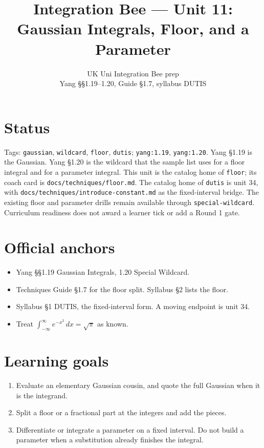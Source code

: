 
\title{Integration Bee --- Unit 11:\\ Gaussian Integrals, Floor, and a Parameter}
\author{UK Uni Integration Bee prep\\ Yang \S\S1.19--1.20, Guide \S1.7, syllabus DUTIS}
\date{}

\maketitle
\section*{Status}
Tags: \texttt{gaussian}, \texttt{wildcard}, \texttt{floor}, \texttt{dutis}; \texttt{yang:1.19}, \texttt{yang:1.20}.
Yang \S1.19 is the Gaussian. Yang \S1.20 is the wildcard that the sample list uses for a floor integral and for a parameter integral. This unit is the catalog home of \texttt{floor}; its coach card is \texttt{docs/techniques/floor.md}. The catalog home of \texttt{dutis} is unit 34, with \texttt{docs/techniques/introduce-constant.md} as the fixed-interval bridge. The existing floor and parameter drills remain available through \texttt{special-wildcard}. Curriculum readiness does not award a learner tick or add a Round 1 gate.
\section{Official anchors}
\begin{itemize}
  \item Yang §§1.19 Gaussian Integrals, 1.20 Special Wildcard.
  \item Techniques Guide §1.7 for the floor split. Syllabus §2 lists the floor.
  \item Syllabus §1 DUTIS, the fixed-interval form. A moving endpoint is unit 34.
  \item Treat $\int_{-\infty}^{\infty}e^{-x^2}\,dx=\sqrt\pi$ as known.
\end{itemize}
\section{Learning goals}
\begin{enumerate}
  \item Evaluate an elementary Gaussian cousin, and quote the full Gaussian when it is the integrand.
  \item Split a floor or a fractional part at the integers and add the pieces.
  \item Differentiate or integrate a parameter on a fixed interval. Do not build a parameter when a substitution already finishes the integral.
\end{enumerate}


